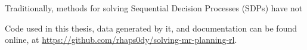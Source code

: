 Traditionally, methods for solving Sequential Decision Processes (SDPs) have not


\vspace{2cm}

Code used in this thesis, data generated by it, and documentation can be found
online, at
\href{https://github.com/rhaps0dy/solving-mr-planning-rl}{https://github.com/rhaps0dy/solving-mr-planning-rl}.